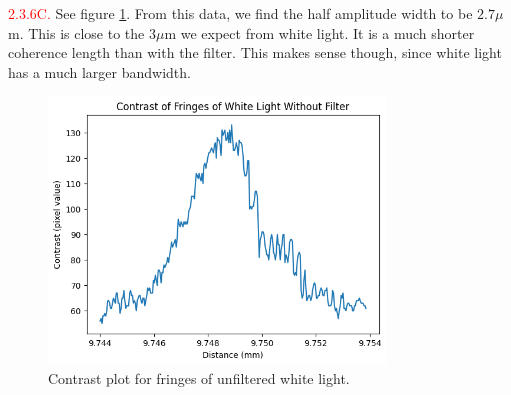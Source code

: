 \documentclass[letterpaper, reqno,11pt]{article}
\begin{document}
\noindent \textcolor{red}{2.3.6C.} See figure \ref{fig:6C}. From this data, we find the half amplitude width to be $2.7\mu$m. This is close to the $3\mu$m we expect from white light. It is a much shorter coherence length than with the filter. This makes sense though, since white light has a much larger bandwidth.

\begin{figure}[htpb]
    \centering
    \includegraphics[width=0.8\textwidth]{6C}
    \caption{Contrast plot for fringes of unfiltered white light.}
    \label{fig:6C}
\end{figure}
\end{document}
